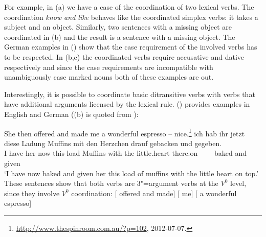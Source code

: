 For example, in (a) we have a case of the coordination of two lexical
verbs. The coordination \emph{know and like} behaves like the coordinated simplex verbs: it takes a
subject and an object. Similarly, two sentences with a missing object are coordinated in (b)
and the result is a sentence with a missing object. 
\eal
{}
\zl
The German examples in () show that the case requirement of the involved verbs has to be
respected. In (b,c) the coordinated verbs require accusative and dative respectively and since
the case requirements are incompatible with unambiguously case marked nouns both of these examples are out.
\eal
{}
\zl

\noindent
Interestingly, it is possible to coordinate basic ditransitive verbs with verbs that have
additional arguments licensed by the lexical rule. () provides examples in English and German
((b) is quoted from ):

\eal
\label{promise-make}
\ex She then offered and made me a wonderful espresso -- nice.\footnote{%
\url{http://www.thespinroom.com.au/?p=102}, 2012-07-07.}
\ex 
\label{ex-gebacken-und-gegeben}
\gll ich hab ihr jetzt diese Ladung Muffins mit den Herzchen drauf gebacken und gegeben.\footnotemark\\
     I have her now this load Muffins with the little.heart there.on~~~~ baked and given\\
\glt `I have now baked and given her this load of muffins with the little heart on top.'
\zl
\noindent
These sentences show that both verbs are 3"=argument verbs at the $V^0$ level, since they involve $V^0$ coordination: 
\ea
{}[\sub{\vnull} offered and made] [ me]    [ a wonderful espresso] 
\z

